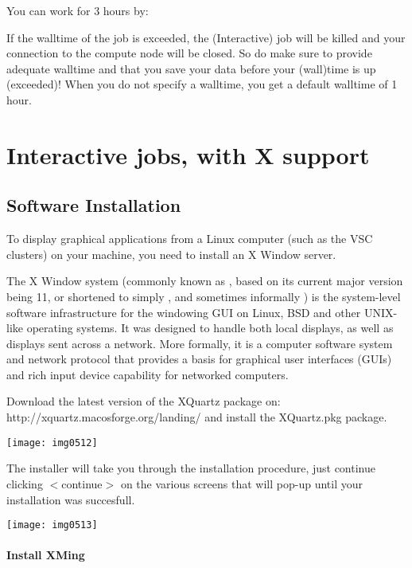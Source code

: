 You can work for 3 hours by:
\begin{prompt}
\end{prompt}

If the walltime of the job is exceeded, the (Interactive) job will be killed
and your connection to the compute node will be closed. So do make sure to
provide adequate walltime and that you save your data before your (wall)time is
up (exceeded)!  When you do not specify a walltime, you get a default walltime
of 1 hour.

\section{Interactive jobs, with X support}

\subsection{Software Installation}

To display graphical applications from a Linux computer (such as the VSC
clusters) on your machine, you need to install an X Window server.

The X Window system (commonly known as , based on its current major
version being 11, or shortened to simply , and sometimes informally
) is the system-level software infrastructure for the
windowing GUI on Linux, BSD and other UNIX-like operating systems. It was
designed to handle both local displays, as well as displays sent across a
network. More formally, it is a computer software system and network protocol
that provides a basis for graphical user interfaces (GUIs) and rich input
device capability for networked computers.

\ifmac
Download the latest version of the XQuartz package on:
http://xquartz.macosforge.org/landing/
and install the XQuartz.pkg package.

\texttt{[image: img0512]}

The installer will take you through the installation procedure, just continue
clicking $<$continue$>$ on the various screens that will pop-up until your
installation was succesfull.

\texttt{[image: img0513]}
\fi

\ifwindows
\paragraph{ Install XMing}

